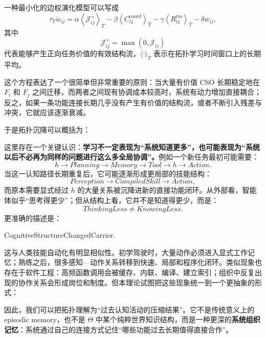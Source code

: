 一种最小化的边权演化模型可以写成
\[
\tau_T
\dot w_{ij}
=
\alpha
\left\langle
\mathcal{J}_{ij}^{+}
\right\rangle_T
-
\beta
\left\langle
C_{ij}^{\mathrm{coord}}
\right\rangle_T
-
\gamma
\left\langle
R_{ij}^{\mathrm{res}}
\right\rangle_T
-
\delta
w_{ij},
\]
其中
\[
\mathcal{J}_{ij}^{+}
=
\max
\left(
0,
\mathcal{J}_{ij}
\right)
\]
代表能够产生正向任务价值的有效结构流，$\langle\cdot\rangle_T$ 表示在拓扑学习时间窗口上的长期平均。

这个方程表达了一个很简单但非常重要的原则：当大量有价值 CSO 长期稳定地在 $F_i$ 和 $F_j$ 之间迁移，而两者之间现有协调成本较高时，系统有动力增加直接耦合；反之，如果一条功能连接长期几乎没有产生有价值的结构流，或者不断引入残差与冲突，它就应该逐渐衰减。

于是拓扑沉降可以概括为：
\begin{statementbox}
\centering
{}
\end{statementbox}

这里存在一个关键认识：\textbf{学习不一定表现为``系统知道更多''，也可能表现为``系统以后不必再为同样的问题进行这么多全局协调''。}例如一个新任务最初可能需要：
\[
h
\rightarrow
Planning
\rightarrow
Memory
\rightarrow
Tool
\rightarrow
h
\rightarrow
Action.
\]
当这一认知路径长期重复后，它可能逐渐形成更局部的技能结构：
\[
Perception
\rightarrow
CompiledSkill
\rightarrow
Action,
\]
而原本需要显式经过 $h$ 的大量关系被沉降进新的直接功能闭环。从外部看，智能体似乎``思考得更少''；但从结构上看，它并不是知道得更少，而是：
\[
\boxed{
ThinkingLess
\neq
KnowingLess.
}
\]
更准确的描述是：
\begin{statementbox}
CognitiveStructureChangedCarrier.
\end{statementbox}

这与人类技能自动化有明显相似性。初学驾驶时，大量动作必须进入显式工作记忆；熟练之后，很多感知—动作关系转移到快速、局部和程序化闭环。类似现象也存在于软件工程：高频函数调用会被缓存、内联、编译、建立索引；组织中反复出现的协作关系会形成岗位和制度。但本理论试图把这些现象统一到一个更抽象的形式：
\begin{statementbox}
\centering
{}
\end{statementbox}

因此，我们可以把拓扑理解为``过去认知活动的压缩结果''。它不是传统意义上的 episodic memory，也不是 $\Theta$ 中某个纯粹世界知识结构，而是一种更深的\textbf{系统组织记忆}：系统通过自己的连接方式记住``哪些功能过去长期值得直接合作''。


